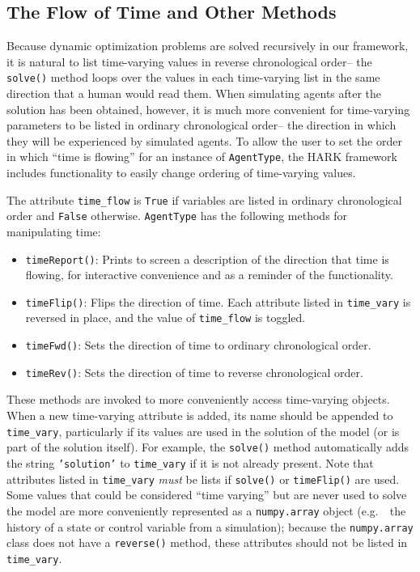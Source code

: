 \documentclass[12pt,titlepage,letterpaper]{econtex}
\begin{document}
\subsection{The Flow of Time and Other Methods}\label{sec:OtherMethods}

Because dynamic optimization problems are solved recursively in our framework, it is natural to list time-varying values in reverse chronological order-- the \texttt{solve()} method loops over the values in each time-varying list in the same direction that a human would read them.  When simulating agents after the solution has been obtained, however, it is much more convenient for time-varying parameters to be listed in ordinary chronological order-- the direction in which they will be experienced by simulated agents.  To allow the user to set the order in which ``time is flowing'' for an instance of \texttt{AgentType}, the HARK framework includes functionality to easily change ordering of time-varying values.

The attribute \texttt{time\_flow} is \texttt{True} if variables are listed in ordinary chronological order and \texttt{False} otherwise.  \texttt{AgentType} has the following methods for manipulating time:
\begin{itemize}
\item \texttt{timeReport()}: Prints to screen a description of the direction that time is flowing, for interactive convenience and as a reminder of the functionality.

\item \texttt{timeFlip()}: Flips the direction of time.  Each attribute listed in \texttt{time\_vary} is reversed in place, and the value of \texttt{time\_flow} is toggled.

\item \texttt{timeFwd()}: Sets the direction of time to ordinary chronological order.

\item \texttt{timeRev()}: Sets the direction of time to reverse chronological order.
\end{itemize}

These methods are invoked to more conveniently access time-varying objects.  When a new time-varying attribute is added, its name should be appended to \texttt{time\_vary}, particularly if its values are used in the solution of the model (or is part of the solution itself).  For example, the \texttt{solve()} method automatically adds the string \texttt{'solution'} to \texttt{time\_vary} if it is not already present.  Note that attributes listed in \texttt{time\_vary} \textit{must} be lists if \texttt{solve()} or \texttt{timeFlip()} are used.  Some values that could be considered ``time varying'' but are never used to solve the model are more conveniently represented as a \texttt{numpy.array} object (e.g.\ \ the history of a state or control variable from a simulation); because the \texttt{numpy.array} class does not have a \texttt{reverse()} method, these attributes should not be listed in \texttt{time\_vary}.
\end{document}
